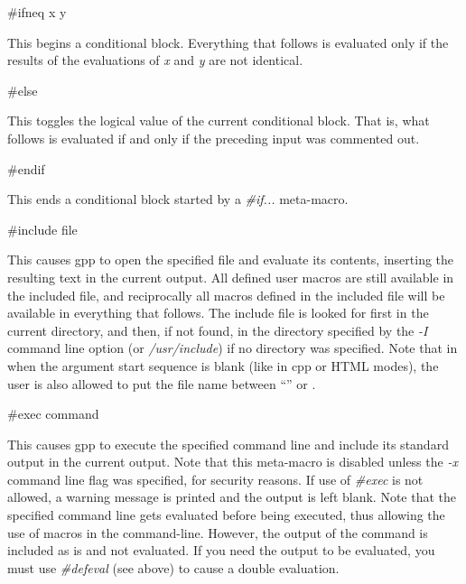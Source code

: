 {\bf 

\begin{PRE}
\#ifneq x y
\end{PRE}

} This begins a conditional block. Everything that follows is evaluated only
if the results of the evaluations of {\it x} and {\it y} are not identical. 

{\bf 

\begin{PRE}
\#else
\end{PRE}

} This toggles the logical value of the current conditional block. That is,
what follows is evaluated if and only if the preceding input was commented
out. 

{\bf 

\begin{PRE}
\#endif
\end{PRE}

} This ends a conditional block started by a {\it \#if...} meta-macro. 

{\bf 

\begin{PRE}
\#include file
\end{PRE}

} This causes gpp to open the specified file and evaluate its contents,
inserting the resulting text in the current output. All defined user macros
are still available in the included file, and reciprocally all macros defined
in the included file will be available in everything that follows. The include
file is looked for first in the current directory, and then, if not found, in
the directory specified by the {\it -I} command line option (or {\it
/usr/include}) if no directory was specified. Note that in when the argument
start sequence is blank (like in cpp or HTML modes), the user is also allowed
to put the file name between ``'' or {\htmlLt}{\htmlGt}. 

{\bf 

\begin{PRE}
\#exec command
\end{PRE}

} This causes gpp to execute the specified command line and include its
standard output in the current output. Note that this meta-macro is disabled
unless the {\it -x} command line flag was specified, for security reasons. If
use of {\it \#exec} is not allowed, a warning message is printed and the
output is left blank. Note that the specified command line gets evaluated
before being executed, thus allowing the use of macros in the command-line.
However, the output of the command is included as is and not evaluated. If you
need the output to be evaluated, you must use {\it \#defeval} (see above) to
cause a double evaluation. 

